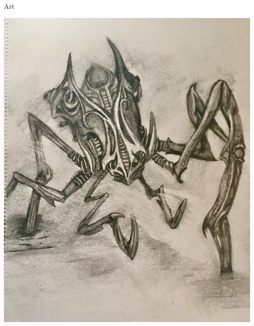 \documentclass{teamepsilon}
\begin{document}
\begin{frame}{Art}

    \vspace{0.5em}
    \begin{minipage}{0.65\textwidth}
        \includegraphics[height=\textheight-3em]{../graphics/spider}
    \end{minipage}%
    \begin{minipage}{0.35\textwidth-1em}

\end{minipage}
\end{frame}
\end{document}
